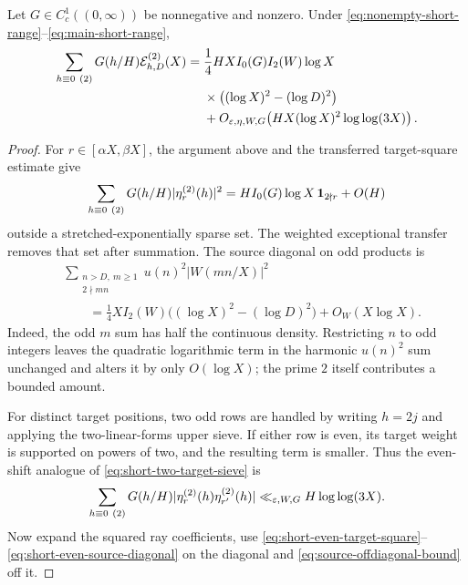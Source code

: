 \begin{proposition}
\label{prop:short-even-energy}
Let $G\in C_c^1((0,\infty))$ be nonnegative and nonzero.  Under
\eqref{eq:nonempty-short-range}--\eqref{eq:main-short-range},
\begin{equation}
 \begin{aligned}
 \sum_{h\equiv0\ (2)}G(h/H)\mathcal E^{(2)}_{h,D}(X)
 ={}&\frac14HX I_0(G)I_2(W)\log X\\
 &\times\bigl((\log X)^2-(\log D)^2\bigr)\\
 &+O_{\varepsilon,\eta,W,G}\!\left(
 HX(\log X)^2\log\log(3X)\right).
 \end{aligned}
 \label{eq:short-even-energy}
\end{equation}
\end{proposition}

\begin{proof}
For $r\in[\alpha X,\beta X]$, the argument above and the transferred
target-square estimate give
\begin{equation}
 \sum_{h\equiv0\ (2)}G(h/H)|\eta_r^{(2)}(h)|^2
 =HI_0(G)\log X\,\mathbf 1_{2\nmid r}+O(H)
 \label{eq:short-even-target-square}
\end{equation}
outside a stretched-exponentially sparse set.  The weighted exceptional
transfer removes that set after summation.  The source diagonal on odd
products is
\begin{equation}
 \begin{aligned}
 &\sum_{\substack{n>D,\ m\geq1\\2\nmid mn}}
 u(n)^2|W(mn/X)|^2\\
 &\qquad=\frac14XI_2(W)
 \bigl((\log X)^2-(\log D)^2\bigr)+O_W(X\log X).
 \end{aligned}
 \label{eq:short-even-source-diagonal}
\end{equation}
Indeed, the odd $m$ sum has half the continuous density.  Restricting
$n$ to odd integers leaves the quadratic logarithmic term in the
harmonic $u(n)^2$ sum unchanged and alters it by only $O(\log X)$; the
prime $2$ itself contributes a bounded amount.

For distinct target positions, two odd rows are handled by writing
$h=2j$ and applying the two-linear-forms upper sieve.  If either row is
even, its target weight is supported on powers of two, and the resulting
term is smaller.  Thus the even-shift analogue of
\eqref{eq:short-two-target-sieve} is
\[
 \sum_{h\equiv0\ (2)}G(h/H)
 |\eta_r^{(2)}(h)\eta_{r'}^{(2)}(h)|
 \ll_{\varepsilon,W,G}H\log\log(3X).
\]
Now expand the squared ray coefficients, use
\eqref{eq:short-even-target-square}--\eqref{eq:short-even-source-diagonal}
on the diagonal and \eqref{eq:source-offdiagonal-bound} off it.
\end{proof}

